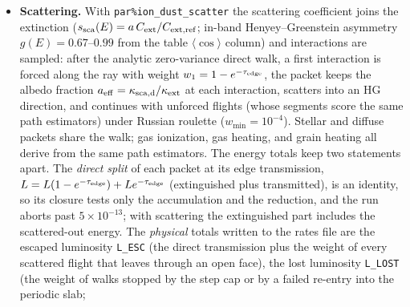\documentclass[english,a4paper]{my_memo}
\newcommand{\code}[1]{\texttt{#1}}
\begin{document}
\begin{itemize}
  $\lambda_{\rm ref}$, and stops the run if it does not (the interpolators
  clamp at the grid edges, so an unchecked short grid would silently freeze
  the EUV optics).  The reference extinction $C_{\rm ext}(\lambda_{\rm ref})$
  itself is the model's own when \code{par\%cext\_dust} is negative (the
  default); a positive value is used as given, with a warning past 1\%
  (\code{dust\_reference\_extinction}).
  Setting \code{par\%ion\_dust\_kext} overrides
  the model with an explicit table covering the EUV (the
  WD01/D03 $R_V{=}3.1$ table, 1\,\AA--$10^4\,\mu$m:
  $C_{\rm abs}/{\rm H} = 1.83{\times}10^{-21}$ at 13.6~eV falling to
  $3.96{\times}10^{-22}\,{\rm cm^2}$ at 100~eV).  A trap worth
  recording: the D03 table is \emph{not monotonic} in wavelength (an
  out-of-order seam) --- without sorting, the linear interpolation
  search silently returned $s_{\rm abs}(100\,{\rm eV}) = 0.903$ instead
  of $0.832$ and shifted the dusty Str\"omgren radius by $+1.6\%$.
\item \textbf{Scattering.}  With \code{par\%ion\_dust\_scatter} the
  scattering coefficient joins the extinction
  ($s_{\rm sca}(E) = a\,C_{\rm ext}/C_{\rm ext,ref}$; in-band
  Henyey--Greenstein asymmetry $g(E) = 0.67$--$0.99$ from the table
  $\langle\cos\rangle$ column) and interactions are sampled: after the
  analytic zero-variance direct walk, a first interaction is forced
  along the ray with weight $w_1 = 1 - e^{-\tau_{\rm edge}}$, the
  packet keeps the albedo fraction
  $a_{\rm eff} = \kappa_{\rm sca,d}/\kappa_{\rm ext}$ at each
  interaction, scatters into an HG direction, and continues with
  unforced flights (whose segments score the same path estimators) under Russian
  roulette ($w_{\min} = 10^{-4}$).  Stellar and diffuse packets share
  the walk; gas ionization, gas heating, and grain heating all derive
  from the same path estimators.  The energy totals keep two statements
  apart.  The \emph{direct split} of each packet at its edge
  transmission, $L = L(1-e^{-\tau_{\rm edge}}) + L e^{-\tau_{\rm edge}}$
  (extinguished plus transmitted), is an identity, so its closure tests
  only the accumulation and the reduction, and the run aborts past
  $5{\times}10^{-13}$; with scattering the extinguished part includes the
  scattered-out energy.  The \emph{physical} totals written to the rates
  file are the escaped luminosity \code{L\_ESC} (the direct transmission
  plus the weight of every scattered flight that leaves through an open
  face), the lost luminosity \code{L\_LOST} (the weight of walks stopped
  by the step cap or by a failed re-entry into the periodic slab;

\end{itemize}
\end{document}
